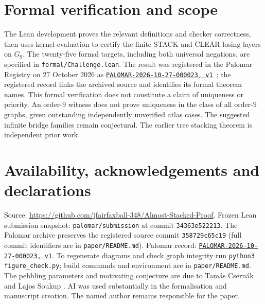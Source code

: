 \documentclass[11pt,a4paper]{article}
\newcommand{\PalomarEntry}{\href{https://palomar-registry.org/entry.html?id=PALOMAR-2026-10-27-000023\&version=1}{\texttt{PALOMAR-2026-10-27-000023, v1}}}
\begin{document}
\section{Formal verification and scope}
The Lean development proves the relevant definitions and checker correctness, then uses kernel evaluation to certify the finite STACK and CLEAR losing layers on \(G_9\). The twenty-five formal targets, including both universal negations, are specified in \texttt{formal/Challenge.lean}. The result was registered in the Palomar Registry on 27 October 2026 as \PalomarEntry\ \cite{PalomarG9}; the registered record links the archived source and identifies its formal theorem names. This formal verification does not constitute a claim of uniqueness or priority.
An order-\(9\) witness does not prove uniqueness in the class of all order-\(9\) graphs, given outstanding independently unverified atlas cases. The suggested infinite bridge families remain conjectural. The earlier tree stacking theorem \cite{TreeStack} is independent prior work.
\section*{Availability, acknowledgements and declarations}
Source: \url{https://github.com/jfairfaxball-348/Almost-Stacked-Proof}. Frozen Lean submission snapshot: \texttt{palomar/submission} at commit \texttt{34363e522213}. The Palomar archive preserves the registered source commit \texttt{358729c65c19} (full commit identifiers are in \texttt{paper/README.md}). Palomar record: \PalomarEntry. To regenerate diagrams and check graph integrity run \texttt{python3 figure\_check.py}; build commands and environment are in \texttt{paper/README.md}. The pebbling parameters and motivating conjecture are due to Tam\'as Csern\'ak and Lajos Soukup \cite{CSApril,CSOctober}. AI was used substantially in the formalisation and manuscript creation. The named author remains responsible for the paper.


\end{document}

